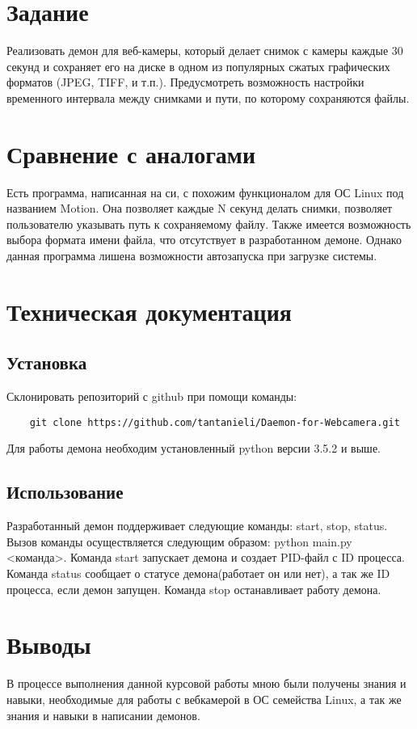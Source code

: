 \documentclass[12pt,a4paper]{scrartcl}
\begin{document}
\section{Задание}
	Реализовать демон для веб-камеры, который делает снимок с
	камеры каждые 30 секунд и сохраняет его на диске в одном из популярных сжатых
	графических форматов (JPEG, TIFF, и т.п.). Предусмотреть возможность настройки
	временного интервала между снимками и пути, по которому сохраняются файлы.
\section{Сравнение с аналогами}
	Есть программа, написанная на си, с похожим функционалом для ОС Linux под названием Motion. Она позволяет каждые N секунд делать снимки, позволяет пользователю указывать путь к сохраняемому файлу. Также имеется возможность выбора формата имени файла, что отсутствует в разработанном демоне. Однако данная программа лишена возможности автозапуска при загрузке системы.
\section{Техническая документация}
\subsection{Установка}
	Склонировать репозиторий с github при помощи команды: \begin{verbatim}
	git clone https://github.com/tantanieli/Daemon-for-Webcamera.git
	\end{verbatim}Для работы демона необходим установленный python версии 3.5.2 и выше.
\subsection{Использование}
	Разработанный демон поддерживает следующие команды: start, stop, status. Вызов команды осуществляется следующим образом: python main.py <команда>. Команда start запускает демона и создает PID-файл с ID процесса. Команда status сообщает о статусе демона(работает он или нет), а так же ID процесса, если демон запущен. Команда stop останавливает работу демона. 
\section{Выводы}
	В процессе выполнения данной курсовой работы мною были получены знания и навыки, необходимые для работы с вебкамерой в ОС семейства Linux, а так же знания и навыки в написании демонов.
	\newpage
\end{document}
